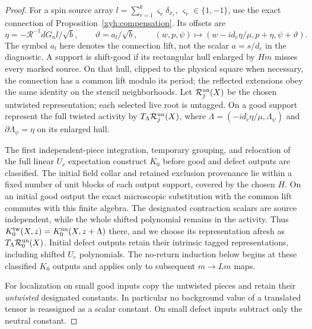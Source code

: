 \begin{proof}
For a spin source array \(l=\sum_{r=1}^k\varsigma_r\delta_{x_r}\),
\(\varsigma_r\in\{1,-1\}\), use the exact connection of
Proposition~\ref{xyh:compensation}.  Its offsets are
\[
 \eta=-\mathcal R^{-1}dG_nl/\sqrt b,
 \qquad \vartheta=a_l/\sqrt b,
 \qquad (w,p,\psi)\mapsto
       (w-id_c\eta/\mu,p+\eta,\psi+\vartheta).
\]
The symbol \(a_l\) here denotes the connection lift, not the scalar
\(a=s/d_c\) in the diagnostic.  A support is shift-good if its
rectangular hull enlarged by \(Hm\) misses every marked source.
On that hull, clipped to the physical square when necessary, the
connection has a common lift modulo its period; the reflected
extensions obey the same identity on the stencil neighborhoods.
Let \(\mathcal R_j^{\rm un}(X)\) be the chosen untwisted representation;
each selected live root is untagged. On a good support represent the full
twisted activity by \(T_\Lambda\mathcal R_j^{\rm un}(X)\), where
\(\Lambda=(-i d_c\eta/\mu,\Lambda_\psi)\) and
\(\partial\Lambda_\psi=\eta\) on its enlarged hull.

The first independent-piece integration, temporary grouping, and relocation
of the full linear \(U_e\) expectation construct \(K_0\) before good and
defect outputs are classified. The initial field collar and retained
exclusion provenance lie within a fixed number of unit blocks of each
output support, covered by the chosen \(H\). On an initial good output the
exact microscopic substitution with the common lift commutes with this
finite algebra. The designated contraction scalars are source independent,
while the whole shifted polynomial remains in the activity. Thus
\(K_0^{\rm tw}(X,z)=K_0^{\rm un}(X,z+\Lambda)\) there, and we choose its
representation afresh as \(T_\Lambda\mathcal R_0^{\rm un}(X)\). Initial
defect outputs retain their intrinsic tagged representations, including
shifted \(U_e\) polynomials. The no-return induction below begins at these
classified \(K_0\) outputs and applies only to subsequent \(m\to Lm\) maps.

For localization on small good inputs copy the untwisted pieces and retain their \emph{untwisted} designated
constants.  In particular no background value of a translated
tensor is reassigned as a scalar constant.  On small defect inputs
subtract only the neutral constant.


\end{proof}
